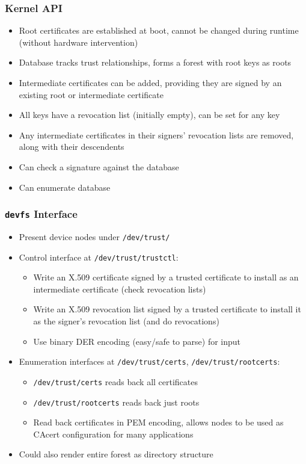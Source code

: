 \documentclass{beamer}
\begin{document}
\begin{frame}
  \frametitle{Kernel API}
  \begin{itemize}
  \item Root certificates are established at boot, cannot be changed
    during runtime (without hardware intervention)
  \item Database tracks trust relationships, forms a forest with root
    keys as roots
  \item Intermediate certificates can be added, providing they are
    signed by an existing root or intermediate certificate
  \item All keys have a revocation list (initially empty), can be set
    for any key
  \item Any intermediate certificates in their signers' revocation
    lists are removed, along with their descendents
  \item Can check a signature against the database
  \item Can enumerate database
  \end{itemize}
\end{frame}


\begin{frame}
  \frametitle{\texttt{devfs} Interface}
  \begin{itemize}
  \item Present device nodes under \texttt{/dev/trust/}
  \item Control interface at \texttt{/dev/trust/trustctl}:
    \begin{itemize}
    \item Write an X.509 certificate signed by a trusted certificate
      to install as an intermediate certificate (check revocation
      lists)
    \item Write an X.509 revocation list signed by a trusted
      certificate to install it as the signer's revocation list (and
      do revocations)
    \item Use binary DER encoding (easy/safe to parse) for input
    \end{itemize}
  \item Enumeration interfaces at \texttt{/dev/trust/certs},
    \texttt{/dev/trust/rootcerts}:
    \begin{itemize}
    \item \texttt{/dev/trust/certs} reads back all certificates
    \item \texttt{/dev/trust/rootcerts} reads back just roots
    \item Read back certificates in PEM encoding, allows nodes to be
      used as CAcert configuration for many applications
    \end{itemize}
  \item Could also render entire forest as directory structure
  \end{itemize}
\end{frame}
\end{document}
